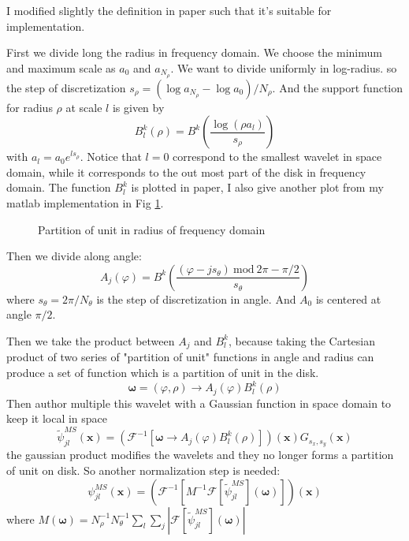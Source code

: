 \documentclass{article}
\begin{document}
	I modified slightly the definition in paper such that it's suitable for implementation.
	
	First we divide long the radius in frequency domain. We choose the minimum and maximum scale as $a_0$ and $a_{N_\rho}$. We want to divide uniformly in log-radius. so the step of discretization $s_\rho=(\log a_{N_\rho} - \log a_0)/N_\rho$. And the support function for radius $\rho$ at scale $l$ is given by
	\begin{equation}
	B_l^k(\rho) = B^k(\frac{\log (\rho a_l
		)}{s_\rho})
	\end{equation}
	with $a_l = a_0 e^{ls_\rho}$.
	Notice that $l=0$ correspond to the smallest wavelet in space domain, while it corresponds to the out most part of the disk in frequency domain. The function $B^k_l$ is plotted in paper, I also give another plot from my matlab implementation in Fig \ref{fig:Bkl}.
	
	\begin{figure}[h]
		\centering
		\caption{Partition of unit in radius of frequency domain}
		\label{fig:Bkl}
	\end{figure}
	
	
	Then we divide along angle: 
	\begin{equation}
	A_j(\varphi) = B^k(\frac{(\varphi-j s_\theta)\ \text{mod}\ 2\pi - \pi/2}{s_\theta})
	\end{equation}
	where $s_\theta = 2\pi/N_\theta$ is the step of discretization in angle. And $A_0$ is centered at angle $\pi/2$.
	
	Then we take the product between $A_j$ and $B_l^k$, because taking the Cartesian product of two series of "partition of unit" functions in angle and radius can produce a set of function which is a partition of unit in the disk.
	\begin{equation}
	\boldsymbol{\omega}=(\varphi,\rho) \rightarrow A_j(\varphi) B_l^k(\rho)
	\end{equation}
	Then author multiple this wavelet with a Gaussian function in space domain to keep it local in space
	\begin{equation}
	\tilde{\psi}^{MS}_{jl}(\mathbf{x}) = (\mathcal{F}^{-1}[\boldsymbol{\omega}\rightarrow A_j(\varphi) B_l^k(\rho)])(\mathbf{x})G_{s_x,s_y}(\mathbf{x})
	\end{equation}
	the gaussian product modifies the wavelets and they no longer forms a partition of unit on disk. So another normalization step is needed:
	\begin{equation}
	\psi^{MS}_{jl}(\mathbf{x}) = (\mathcal{F}^{-1}[M^{-1}\mathcal{F}[\tilde{\psi}^{MS}_{jl}](\boldsymbol{\omega})])(\mathbf{x})
	\end{equation}
	where $M(\boldsymbol{\omega}) = N_\rho^{-1} N_\theta^{-1} \sum_{l}\sum_{j} |\mathcal{F}[\tilde{\psi}^{MS}_{jl}](\boldsymbol{\omega})|$
	
\end{document}
